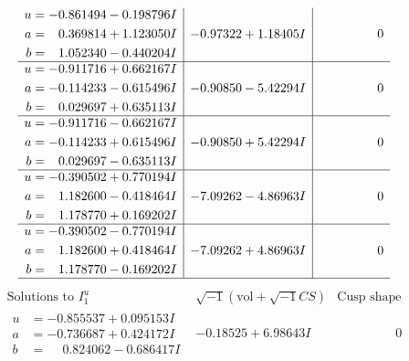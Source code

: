 \documentclass[1p]{elsarticle_modified}
\theoremstyle{definition}
\newcommand{\I}{\sqrt{-1}}
\begin{document}
$$\begin{array}{c|c|c}
\begin{aligned}
u &= -0.861494 - 0.198796 I \\
a &= \phantom{-}0.369814 + 1.123050 I \\
b &= \phantom{-}1.052340 - 0.440204 I\end{aligned}
 & -0.97322 + 1.18405 I & \phantom{-0.000000 } 0 \\ \hline\begin{aligned}
u &= -0.911716 + 0.662167 I \\
a &= -0.114233 - 0.615496 I \\
b &= \phantom{-}0.029697 + 0.635113 I\end{aligned}
 & -0.90850 - 5.42294 I & \phantom{-0.000000 } 0 \\ \hline\begin{aligned}
u &= -0.911716 - 0.662167 I \\
a &= -0.114233 + 0.615496 I \\
b &= \phantom{-}0.029697 - 0.635113 I\end{aligned}
 & -0.90850 + 5.42294 I & \phantom{-0.000000 } 0 \\ \hline\begin{aligned}
u &= -0.390502 + 0.770194 I \\
a &= \phantom{-}1.182600 - 0.418464 I \\
b &= \phantom{-}1.178770 + 0.169202 I\end{aligned}
 & -7.09262 - 4.86963 I & \phantom{-0.000000 } 0 \\ \hline\begin{aligned}
u &= -0.390502 - 0.770194 I \\
a &= \phantom{-}1.182600 + 0.418464 I \\
b &= \phantom{-}1.178770 - 0.169202 I\end{aligned}
 & -7.09262 + 4.86963 I & \phantom{-0.000000 } 0\\
 \hline 
 \end{array}$$\newpage$$\begin{array}{c|c|c}  
\text{Solutions to }I^u_{1}& \I (\text{vol} + \sqrt{-1}CS) & \text{Cusp shape}\\
 \hline 
\begin{aligned}
u &= -0.855537 + 0.095153 I \\
a &= -0.736687 + 0.424172 I \\
b &= \phantom{-}0.824062 - 0.686417 I\end{aligned}
 & -0.18525 + 6.98643 I & \phantom{-0.000000 } 0 \\ \hline\begin{aligned}

\end{aligned}
\end{array}$$
\end{document}
